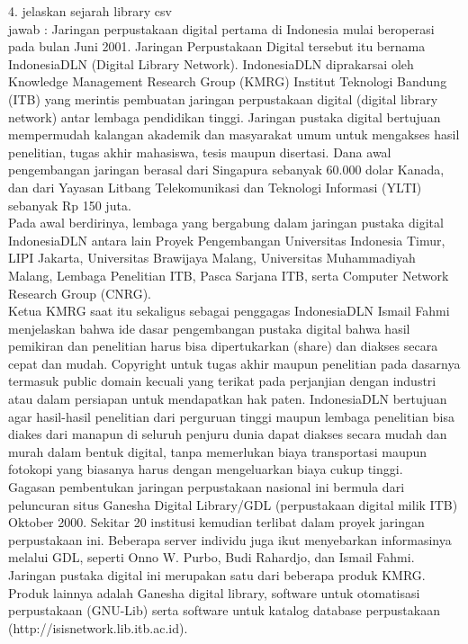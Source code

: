 4. jelaskan sejarah library csv\\
jawab : Jaringan perpustakaan digital pertama di Indonesia mulai beroperasi pada bulan Juni 2001.  Jaringan Perpustakaan Digital tersebut itu bernama IndonesiaDLN (Digital Library Network).  IndonesiaDLN diprakarsai oleh Knowledge Management Research Group (KMRG) Institut Teknologi Bandung (ITB) yang merintis pembuatan jaringan perpustakaan digital (digital library network) antar lembaga pendidikan tinggi.  Jaringan pustaka digital bertujuan mempermudah kalangan akademik dan masyarakat umum untuk mengakses hasil penelitian, tugas akhir mahasiswa, tesis maupun disertasi. Dana awal pengembangan jaringan berasal dari Singapura sebanyak 60.000 dolar Kanada, dan dari Yayasan Litbang Telekomunikasi dan Teknologi Informasi (YLTI) sebanyak Rp 150 juta. \\

Pada awal berdirinya, lembaga yang bergabung dalam jaringan pustaka digital IndonesiaDLN antara lain Proyek Pengembangan Universitas Indonesia Timur, LIPI Jakarta, Universitas Brawijaya Malang, Universitas Muhammadiyah Malang, Lembaga Penelitian ITB, Pasca Sarjana ITB, serta Computer Network Research Group (CNRG).\\

Ketua KMRG saat itu sekaligus sebagai penggagas IndonesiaDLN Ismail Fahmi menjelaskan bahwa ide dasar pengembangan pustaka digital bahwa hasil pemikiran dan penelitian harus bisa dipertukarkan (share) dan diakses secara cepat dan mudah. Copyright untuk tugas akhir maupun penelitian pada dasarnya termasuk public domain kecuali yang terikat pada perjanjian dengan industri atau dalam persiapan untuk mendapatkan hak paten. IndonesiaDLN bertujuan agar hasil-hasil penelitian dari perguruan tinggi maupun lembaga penelitian bisa diakes dari manapun di seluruh penjuru dunia dapat diakses secara mudah dan murah dalam bentuk digital, tanpa memerlukan biaya transportasi maupun fotokopi yang biasanya harus dengan mengeluarkan biaya cukup tinggi.\\

Gagasan pembentukan jaringan perpustakaan nasional ini bermula dari peluncuran situs Ganesha Digital Library/GDL (perpustakaan digital milik ITB) Oktober 2000. Sekitar 20 institusi kemudian terlibat dalam proyek jaringan perpustakaan ini. Beberapa server individu juga ikut menyebarkan informasinya melalui GDL, seperti Onno W. Purbo, Budi Rahardjo, dan Ismail Fahmi.\\

Jaringan pustaka digital ini merupakan satu dari beberapa produk KMRG. Produk lainnya adalah Ganesha digital library, software untuk otomatisasi perpustakaan (GNU-Lib) serta software untuk katalog database perpustakaan\\
(http://isisnetwork.lib.itb.ac.id).\\

